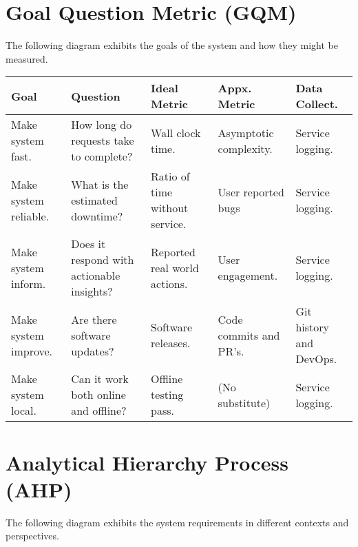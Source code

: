 \documentclass{article}
\begin{document}
\section*{Goal Question Metric (GQM)}

The following diagram exhibits the goals of the system and how they might be measured.\\

    \begin{tabular}{ | m{56pt} | m{96pt}| m{72pt} | m{70pt} | m{68pt} | }    
        \hline
        \textbf{Goal} & \textbf{Question} & \textbf{Ideal Metric} & \textbf{Appx. Metric} & \textbf{Data Collect.}\\ 
        \hline
        Make system fast. & How long do requests take to complete? & Wall clock time. & Asymptotic complexity. & Service logging.\\ 
        \hline
        Make system reliable. & What is the estimated downtime? & Ratio of time without service. & User reported bugs & Service logging.\\ 
        \hline
        Make system inform. & Does it respond with actionable insights? & Reported real world actions. & User engagement. & Service logging.\\ 
        \hline
        Make system improve. & Are there software updates? & Software releases. & Code commits and PR's. & Git history and DevOps.\\ 
        \hline
        Make system local. & Can it work both online and offline? & Offline testing pass. & (No substitute) & Service logging.\\ 
        \hline
    \end{tabular}

\section*{Analytical Hierarchy Process (AHP)}

The following diagram exhibits the system requirements in different contexts and perspectives.\\
\end{document}
